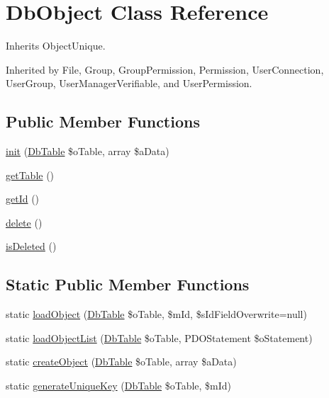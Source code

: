 \hypertarget{class_db_object}{\section{Db\-Object Class Reference}
\label{class_db_object}
}


Inherits Object\-Unique.



Inherited by File, Group, Group\-Permission, Permission, User\-Connection, User\-Group, User\-Manager\-Verifiable, and User\-Permission.

\subsection*{Public Member Functions}
\begin{DoxyCompactItemize}
\item 
\hyperlink{class_db_object_ab3d335221706ac2e08f299a4455f6a31}{init} (\hyperlink{class_db_table}{Db\-Table} \$o\-Table, array \$a\-Data)
\item 
\hyperlink{class_db_object_ab927f1a5cac1905a0be1452d0ef76aac}{get\-Table} ()
\item 
\hyperlink{class_db_object_a38e5ae3d5bf25b14cbaf70abe7e8159c}{get\-Id} ()
\item 
\hyperlink{class_db_object_afba4ed3fd0560178f3dde75ca5f71b8d}{delete} ()
\item 
\hyperlink{class_db_object_a3e1d2098bd1491048f134dc8fcde055c}{is\-Deleted} ()
\end{DoxyCompactItemize}
\subsection*{Static Public Member Functions}
\begin{DoxyCompactItemize}
\item 
static \hyperlink{class_db_object_a34b933c020ec318e268ba64ed65f5b9f}{load\-Object} (\hyperlink{class_db_table}{Db\-Table} \$o\-Table, \$m\-Id, \$s\-Id\-Field\-Overwrite=null)
\item 
static \hyperlink{class_db_object_a75eacf385371fb1d558ab6e3361d9b3d}{load\-Object\-List} (\hyperlink{class_db_table}{Db\-Table} \$o\-Table, P\-D\-O\-Statement \$o\-Statement)
\item 
static \hyperlink{class_db_object_a48c2d33c43e6f0b68b4e7dcde9cd8c12}{create\-Object} (\hyperlink{class_db_table}{Db\-Table} \$o\-Table, array \$a\-Data)
\item 
static \hyperlink{class_db_object_a8b9c9c2300e93e1e84b08c90a20d651d}{generate\-Unique\-Key} (\hyperlink{class_db_table}{Db\-Table} \$o\-Table, \$m\-Id)
\end{DoxyCompactItemize}

